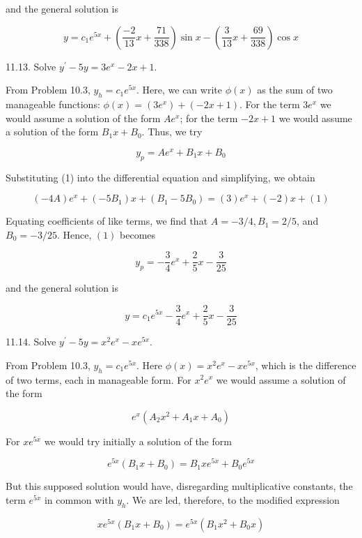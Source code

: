 \documentclass[10pt]{article}
\begin{document}
and the general solution is

$$
y=c_{1} e^{5 x}+\left(\frac{-2}{13} x+\frac{71}{338}\right) \sin x-\left(\frac{3}{13} x+\frac{69}{338}\right) \cos x
$$

11.13. Solve $y^{\prime}-5 y=3 e^{x}-2 x+1$.

From Problem 10.3, $y_{h}=c_{1} e^{5 x}$. Here, we can write $\phi(x)$ as the sum of two manageable functions: $\phi(x)=\left(3 e^{x}\right)+(-2 x+1)$. For the term $3 e^{x}$ we would assume a solution of the form $A e^{x}$; for the term $-2 x+1$ we would assume a solution of the form $B_{1} x+B_{0}$. Thus, we try


\begin{equation*}
y_{p}=A e^{x}+B_{1} x+B_{0} \tag{1}
\end{equation*}


Substituting (1) into the differential equation and simplifying, we obtain

$$
(-4 A) e^{x}+\left(-5 B_{1}\right) x+\left(B_{1}-5 B_{0}\right)=(3) e^{x}+(-2) x+(1)
$$

Equating coefficients of like terms, we find that $A=-3 / 4, B_{1}=2 / 5$, and $B_{0}=-3 / 25$. Hence, $(1)$ becomes

$$
y_{p}=-\frac{3}{4} e^{x}+\frac{2}{5} x-\frac{3}{25}
$$

and the general solution is

$$
y=c_{1} e^{5 x}-\frac{3}{4} e^{x}+\frac{2}{5} x-\frac{3}{25}
$$

11.14. Solve $y^{\prime}-5 y=x^{2} e^{x}-x e^{5 x}$.

From Problem 10.3, $y_{h}=c_{1} e^{5 x}$. Here $\phi(x)=x^{2} e^{x}-x e^{5 x}$, which is the difference of two terms, each in manageable form. For $x^{2} e^{x}$ we would assume a solution of the form


\begin{equation*}
e^{x}\left(A_{2} x^{2}+A_{1} x+A_{0}\right) \tag{1}
\end{equation*}


For $x e^{5 x}$ we would try initially a solution of the form

$$
e^{5 x}\left(B_{1} x+B_{0}\right)=B_{1} x e^{5 x}+B_{0} e^{5 x}
$$

But this supposed solution would have, disregarding multiplicative constants, the term $e^{5 x}$ in common with $y_{h}$. We are led, therefore, to the modified expression


\begin{equation*}
x e^{5 x}\left(B_{1} x+B_{0}\right)=e^{5 x}\left(B_{1} x^{2}+B_{0} x\right) \tag{2}
\end{equation*}
\end{document}
